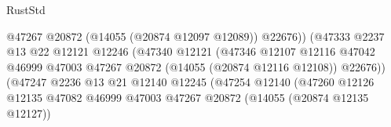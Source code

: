 \begin{lexlean}{RustStd}
\begin{coremodule}
                                                          @47267
                                                          @20872
                                                          (@14055 (@20874 @12097 @12089))
                                                          @22676))
                                                      (@47333
                                                        @2237
                                                        @13
                                                        @22
                                                        @12121
                                                        @12246
                                                        (@47340
                                                          @12121
                                                          (@47346
                                                            @12107
                                                            @12116
                                                            @47042
                                                            @46999
                                                            @47003
                                                            @47267
                                                            @20872
                                                            (@14055 (@20874 @12116 @12108))
                                                            @22676))
                                                        (@47247
                                                          @2236
                                                          @13
                                                          @21
                                                          @12140
                                                          @12245
                                                          (@47254
                                                            @12140
                                                            (@47260
                                                              @12126
                                                              @12135
                                                              @47082
                                                              @46999
                                                              @47003
                                                              @47267
                                                              @20872
                                                              (@14055 (@20874 @12135 @12127))

\end{coremodule}
\end{lexlean}
